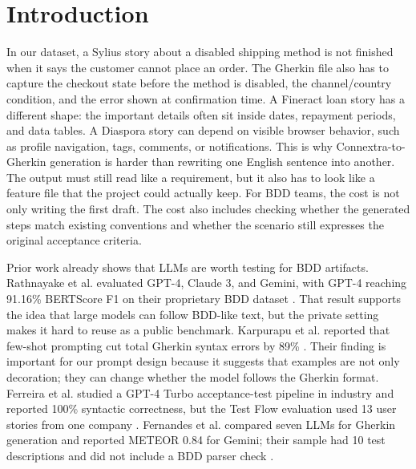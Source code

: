 \section{Introduction}
\label{sec:intro}

In our dataset, a Sylius story about a disabled shipping method is not finished when it says the customer cannot place an order. The Gherkin file also has to capture the checkout state before the method is disabled, the channel/country condition, and the error shown at confirmation time. A Fineract loan story has a different shape: the important details often sit inside dates, repayment periods, and data tables. A Diaspora story can depend on visible browser behavior, such as profile navigation, tags, comments, or notifications. This is why Connextra-to-Gherkin generation is harder than rewriting one English sentence into another. The output must still read like a requirement, but it also has to look like a feature file that the project could actually keep. For BDD teams, the cost is not only writing the first draft. The cost also includes checking whether the generated steps match existing conventions and whether the scenario still expresses the original acceptance criteria.

Prior work already shows that LLMs are worth testing for BDD artifacts. Rathnayake et al. evaluated GPT-4, Claude 3, and Gemini, with GPT-4 reaching 91.16\% BERTScore F1 on their proprietary BDD dataset \cite{rathnayake2026bddgeneration}. That result supports the idea that large models can follow BDD-like text, but the private setting makes it hard to reuse as a public benchmark. Karpurapu et al. reported that few-shot prompting cut total Gherkin syntax errors by 89\% \cite{karpurapu2024bddautomation}. Their finding is important for our prompt design because it suggests that examples are not only decoration; they can change whether the model follows the Gherkin format. Ferreira et al. studied a GPT-4 Turbo acceptance-test pipeline in industry and reported 100\% syntactic correctness, but the Test Flow evaluation used 13 user stories from one company \cite{ferreira2025industrialcasestudy}. Fernandes et al. compared seven LLMs for Gherkin generation and reported METEOR 0.84 for Gemini; their sample had 10 test descriptions and did not include a BDD parser check \cite{fernandes2025gherkin}.

